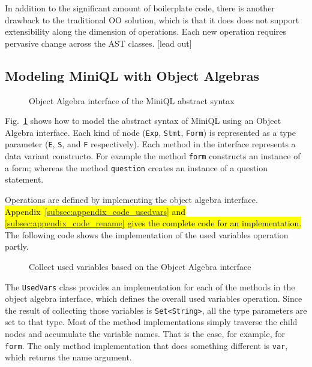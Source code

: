 In addition to the significant amount of boilerplate code, there is another  drawback to the traditional OO solution, which is that it does  does not support extensibility along the dimension of operations. Each new operation requires pervasive change across the AST classes.
[lead out]

\subsection{Modeling MiniQL with Object Algebras}\label{subsec:model_ql_with_oa}


\begin{figure}[h]
\nocaptionrule
\caption{Object Algebra interface of the MiniQL abstract syntax}
\label{ql_tree}
\end{figure}

Fig.~\ref{ql_tree} shows how  to model the abstract syntax of MiniQL
using an Object Algebra interface. Each kind of node (\lstinline{Exp}, \lstinline{Stmt}, \lstinline{Form})
is represented as a type parameter (\lstinline{E}, \lstinline{S}, and \lstinline{F} respectively).
Each method in the interface represents a data variant
constructo. For example the
method \lstinline{form} constructs an instance of a form; whereas the
method \lstinline{question} creates an instance of a question statement.

Operations are defined by implementing the object algebra interface. \hl{Appendix~\ref{subsec:appendix_code_usedvars} and \ref{subsec:appendix_code_rename} gives the complete code for an implementation.}
The following code shows the implementation of the used variables
operation partly.

\begin{figure}[t]
  \caption{Collect used variables based on the Object Algebra interface}
  \label{ql_usedvars}
\end{figure}

The \lstinline{UsedVars} class provides an implementation for each
of the methods in the object algebra interface, which defines the
overall used variables operation. Since the result of collecting those
variables is \lstinline{Set<String>}, all the type parameters are set to
that type. Most of the method implementations simply traverse the
child nodes and accumulate the variable names. That is the case, for
example, for \lstinline{form}. The only method implementation that does
something different is \lstinline{var}, which returns the name
argument.

